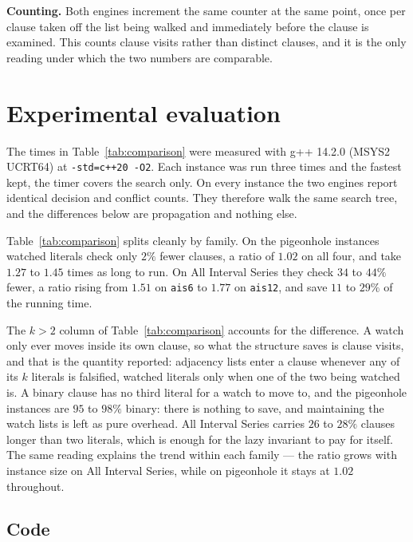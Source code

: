 \documentclass[11pt,a4paper]{article}
\begin{document}
\textbf{Counting.} Both engines increment the same counter at the same point,
once per clause taken off the list being walked and immediately before the
clause is examined. This counts clause visits rather than distinct clauses, and
it is the only reading under which the two numbers are comparable.

\section{Experimental evaluation}

The times in Table~\ref{tab:comparison} were measured with g++ 14.2.0
(MSYS2 UCRT64) at \texttt{-std=c++20 -O2}. Each instance was run three times and
the fastest kept, the timer covers the search only. On every instance the two
engines report identical decision and conflict counts. They therefore walk the
same search tree, and the differences below are propagation and nothing else.



Table~\ref{tab:comparison} splits cleanly by family. On the pigeonhole instances
watched literals check only $2\%$ fewer clauses, a ratio of $1.02$ on all four,
and take $1.27$ to $1.45$ times as long to run. On All Interval Series they
check $34$ to $44\%$ fewer, a ratio rising from $1.51$ on \texttt{ais6} to
$1.77$ on \texttt{ais12}, and save $11$ to $29\%$ of the running time.

The $k>2$ column of Table~\ref{tab:comparison} accounts for the difference. A
watch only ever moves inside its own clause, so what the structure saves is
clause visits, and that is the quantity reported: adjacency lists
enter a clause whenever any of its $k$ literals is falsified, watched literals
only when one of the two being watched is. A binary clause has no third literal
for a watch to move to, and the pigeonhole instances are $95$ to $98\%$ binary:
there is nothing to save, and maintaining the watch lists is left as pure
overhead. All Interval Series carries $26$ to $28\%$ clauses longer than two
literals, which is enough for the lazy invariant to pay for itself. The same
reading explains the trend within each family --- the ratio grows with instance
size on All Interval Series, while on pigeonhole it stays at $1.02$ throughout.

\subsection*{Code}
\end{document}
